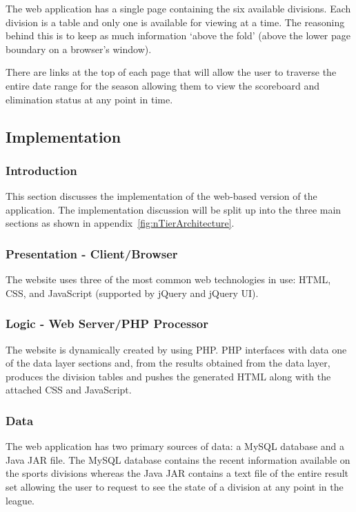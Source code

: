 The web application has a single page containing the six available divisions.
Each division is a table and only one is available for viewing at a time. The 
reasoning behind this is to keep as much information `above the fold' (above the
lower page boundary on a browser's window).

There are links at the top of each page that will allow the user to traverse
the entire date range for the season allowing them to view the scoreboard and
elimination status at any point in time.

\subsection{Implementation}

\subsubsection{Introduction}

This section discusses the implementation of the web-based version of the
application. The implementation discussion will be split up into the three
main sections as shown in appendix~\ref{fig:nTierArchitecture}.

\subsubsection{Presentation - Client/Browser}

The website uses three of the most common web technologies in use: HTML, CSS,
and JavaScript (supported by jQuery and jQuery UI).

\subsubsection{Logic - Web Server/PHP Processor}

The website is dynamically created by using PHP. PHP interfaces with data one
of the data layer sections and, from the results obtained from the data layer,
produces the division tables and pushes the generated HTML along with the
attached CSS and JavaScript.

\subsubsection{Data}

The web application has two primary sources of data: a MySQL database and a
Java JAR file. The MySQL database contains the recent information available
on the sports divisions whereas the Java JAR contains a text file of the entire
result set allowing the user to request to see the state of a division at any
point in the league.

